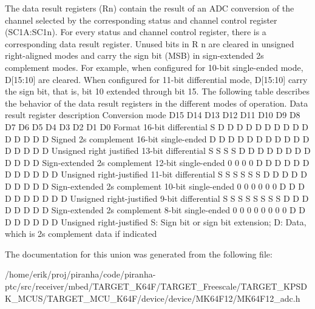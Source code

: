 The data result registers (Rn) contain the result of an A\+DC conversion of the channel selected by the corresponding status and channel control register (S\+C1A\+:S\+C1n). For every status and channel control register, there is a corresponding data result register. Unused bits in R n are cleared in unsigned right-\/aligned modes and carry the sign bit (M\+SB) in sign-\/extended 2\textquotesingle{}s complement modes. For example, when configured for 10-\/bit single-\/ended mode, D\mbox{[}15\+:10\mbox{]} are cleared. When configured for 11-\/bit differential mode, D\mbox{[}15\+:10\mbox{]} carry the sign bit, that is, bit 10 extended through bit 15. The following table describes the behavior of the data result registers in the different modes of operation. Data result register description Conversion mode D15 D14 D13 D12 D11 D10 D9 D8 D7 D6 D5 D4 D3 D2 D1 D0 Format 16-\/bit differential S D D D D D D D D D D D D D D D Signed 2\textquotesingle{}s complement 16-\/bit single-\/ended D D D D D D D D D D D D D D D D Unsigned right justified 13-\/bit differential S S S S D D D D D D D D D D D D Sign-\/extended 2\textquotesingle{}s complement 12-\/bit single-\/ended 0 0 0 0 D D D D D D D D D D D D Unsigned right-\/justified 11-\/bit differential S S S S S S D D D D D D D D D D Sign-\/extended 2\textquotesingle{}s complement 10-\/bit single-\/ended 0 0 0 0 0 0 D D D D D D D D D D Unsigned right-\/justified 9-\/bit differential S S S S S S S S D D D D D D D D Sign-\/extended 2\textquotesingle{}s complement 8-\/bit single-\/ended 0 0 0 0 0 0 0 0 D D D D D D D D Unsigned right-\/justified S\+: Sign bit or sign bit extension; D\+: Data, which is 2\textquotesingle{}s complement data if indicated 

The documentation for this union was generated from the following file\+:\begin{DoxyCompactItemize}
\item 
/home/erik/proj/piranha/code/piranha-\/ptc/src/receiver/mbed/\+T\+A\+R\+G\+E\+T\+\_\+\+K64\+F/\+T\+A\+R\+G\+E\+T\+\_\+\+Freescale/\+T\+A\+R\+G\+E\+T\+\_\+\+K\+P\+S\+D\+K\+\_\+\+M\+C\+U\+S/\+T\+A\+R\+G\+E\+T\+\_\+\+M\+C\+U\+\_\+\+K64\+F/device/device/\+M\+K64\+F12/M\+K64\+F12\+\_\+adc.\+h\end{DoxyCompactItemize}
